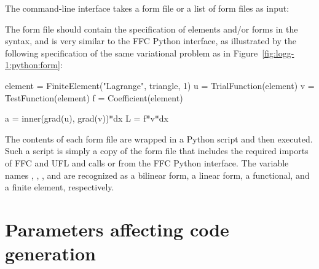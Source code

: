 The command-line interface takes a \ufl{} form file or a list of form
files as input:
The form file should contain the specification of elements and/or
forms in the~\ufl{} syntax, and is very similar to the FFC Python
interface, as illustrated by the following specification of the same
variational problem as in Figure~\ref{fig:logg-1:python:form}:
\begin{python}
element = FiniteElement("Lagrange", triangle, 1)
u = TrialFunction(element)
v = TestFunction(element)
f = Coefficient(element)

a = inner(grad(u), grad(v))*dx
L = f*v*dx
\end{python}
The contents of each form file are wrapped in a Python script
and then executed. Such a script is simply a copy of the form file
that includes the required imports of FFC and UFL and calls
 or  from the FFC
Python interface. The variable names , ,
, and  are recognized as a bilinear form,
a linear form, a functional, and a finite element, respectively.

\section{Parameters affecting code generation}

